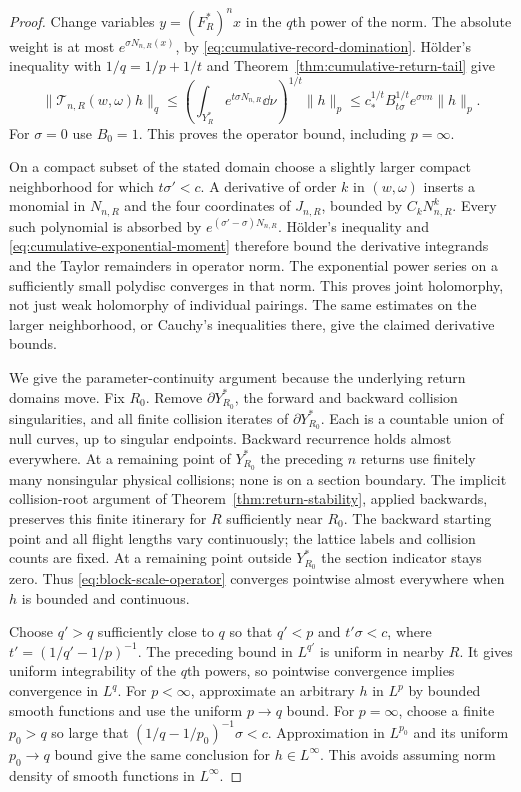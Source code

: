 \begin{proof}
Change variables $y=(F_R^*)^n x$ in the $q$th power of the norm. The
absolute weight is at most $e^{\sigma N_{n,R}(x)}$, by
\eqref{eq:cumulative-record-domination}. H\"older's inequality with
$1/q=1/p+1/t$ and Theorem~\ref{thm:cumulative-return-tail} give
\[
 \|\mathcal T_{n,R}(w,\omega)h\|_q
 \le\left(\int_{Y_R^*}e^{t\sigma N_{n,R}}\dd\nu\right)^{1/t}
       \|h\|_p
 \le c_*^{1/t}B_{t\sigma}^{1/t}e^{\sigma vn}\|h\|_p.
\]
For $\sigma=0$ use $B_0=1$. This proves the operator bound, including
$p=\infty$.

On a compact subset of the stated domain choose a slightly larger
compact neighborhood for which $t\sigma'<c$. A derivative of order
$k$ in $(w,\omega)$ inserts a monomial in $N_{n,R}$ and the four
coordinates of $J_{n,R}$, bounded by $C_kN_{n,R}^k$. Every such
polynomial is absorbed by $e^{(\sigma'-\sigma)N_{n,R}}$. H\"older's
inequality and \eqref{eq:cumulative-exponential-moment} therefore bound
the derivative integrands and the Taylor remainders in operator norm.
The exponential power series on a sufficiently small polydisc converges
in that norm. This proves joint holomorphy, not just weak holomorphy of
individual pairings. The same estimates on the larger neighborhood,
or Cauchy's inequalities there, give the claimed derivative bounds.

We give the parameter-continuity argument because the underlying return
domains move. Fix $R_0$. Remove $\partial Y_{R_0}^*$, the forward and
backward collision singularities, and all finite collision iterates of
$\partial Y_{R_0}^*$. Each is a countable union of null curves, up to
singular endpoints. Backward recurrence holds almost everywhere. At a
remaining point of $Y_{R_0}^*$ the preceding $n$ returns use finitely many
nonsingular physical collisions; none is on a section boundary. The
implicit collision-root argument of
Theorem~\ref{thm:return-stability}, applied backwards, preserves this
finite itinerary for $R$ sufficiently near $R_0$. The backward starting
point and all flight lengths vary continuously; the lattice labels and
collision counts are fixed. At a remaining point outside $Y_{R_0}^*$
the section indicator stays zero. Thus
\eqref{eq:block-scale-operator} converges pointwise almost everywhere
when $h$ is bounded and continuous.

Choose $q'>q$ sufficiently close to $q$ so that $q'<p$ and
$t'\sigma<c$, where $t'=(1/q'-1/p)^{-1}$. The preceding bound in
$L^{q'}$ is uniform in nearby $R$. It gives uniform integrability of the
$q$th powers, so pointwise convergence implies convergence in $L^q$.
For $p<\infty$, approximate an arbitrary $h$ in $L^p$ by bounded smooth
functions and use the uniform $p\to q$ bound. For $p=\infty$, choose a
finite $p_0>q$ so large that $(1/q-1/p_0)^{-1}\sigma<c$. Approximation
in $L^{p_0}$ and its uniform $p_0\to q$ bound give the same conclusion
for $h\in L^\infty$. This avoids assuming norm density of smooth
functions in $L^\infty$.


\end{proof}
